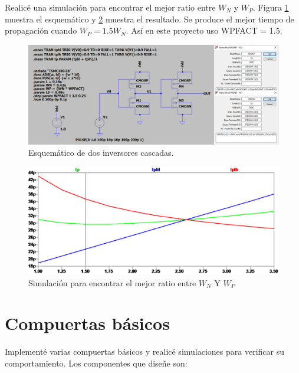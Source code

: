 \documentclass[a4paper]{article}
\begin{document}
Realicé una simulación para encontrar el mejor ratio entre $W_N$ y $W_P$. Figura \ref{fig:wpfact_sch} muestra el esquemático y \ref{fig:wpfact_sim} muestra el resultado. Se produce el mejor tiempo de propagación cuando $W_P = 1.5 W_N$. Así en este proyecto uso WPFACT = 1.5.

\begin{figure}[!htb]
\centering
\includegraphics[scale=0.3]{./img/wpfact_sch}
\caption{Esquemático de dos inversores cascadas.}
\label{fig:wpfact_sch}
\end{figure}

\begin{figure}[!htb]
\centering
\includegraphics[scale=0.4]{./img/wpfact_sim}
\caption{Simulación para encontrar el mejor ratio entre $W_N$ Y $W_P$}
\label{fig:wpfact_sim}
\end{figure}

\section{Compuertas básicos}

Implementé varias compuertas básicos y realicé simulaciones para verificar su comportamiento. Los componentes que diseñe son:
\end{document}

